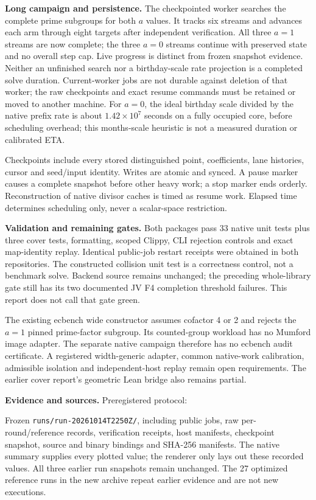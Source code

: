 \documentclass[10pt]{article}
\begin{document}
\textbf{Long campaign and persistence.} The checkpointed worker searches the
complete prime subgroups for both $a$ values. It tracks six streams
and advances each arm through eight targets after independent verification.
All three $a=1$ streams are now complete; the three $a=0$ streams continue
with preserved state and no overall step cap. Live progress is distinct from frozen
snapshot evidence. Neither an unfinished search nor a birthday-scale rate
projection is a completed solve duration. Current-worker jobs are not durable
against deletion of that worker; the raw checkpoints and exact resume commands
must be retained or moved to another machine.
For $a=0$, the ideal birthday scale divided by the native prefix rate is about
$1.42\times10^7$ seconds on a fully occupied core, before scheduling overhead;
this months-scale heuristic is not a measured duration or calibrated ETA.

Checkpoints include every stored distinguished point, coefficients, lane
histories, cursor and seed/input identity. Writes are atomic and synced. A
pause marker causes a complete snapshot before other heavy work; a stop marker
ends orderly. Reconstruction of native divisor caches is timed as resume work.
Elapsed time determines scheduling only, never a scalar-space restriction.

\newpage
\textbf{Validation and remaining gates.} Both packages pass 33 native unit
tests plus three cover tests, formatting, scoped Clippy, CLI rejection controls
and exact map-identity replay. Identical public-job restart receipts were
obtained in both repositories. The constructed collision unit test is a
correctness control, not a benchmark solve. Backend source remains unchanged;
the preceding whole-library gate still has its two documented JV F4 completion
threshold failures. This report does not call that gate green.

The existing ecbench wide constructor assumes cofactor 4 or 2 and rejects the
$a=1$ pinned prime-factor subgroup. Its counted-group workload has no Mumford
image adapter. The separate native campaign therefore has no ecbench audit
certificate. A registered width-generic adapter, common native-work calibration,
admissible isolation and independent-host replay remain open requirements.
The earlier cover report's geometric Lean bridge also remains partial.

\textbf{Evidence and sources.} Preregistered protocol:
\par{\small{}}\par
Frozen \texttt{runs/run-20261014T2250Z/}, including public jobs, raw per-round/reference
records, verification receipts, host manifests, checkpoint snapshot, source and
binary bindings and SHA-256 manifests. The native summary supplies every plotted
value; the renderer only lays out these recorded values. All three earlier
run snapshots remain unchanged. The 27 optimized reference
runs in the new archive repeat earlier evidence and are not new executions.
\end{document}
